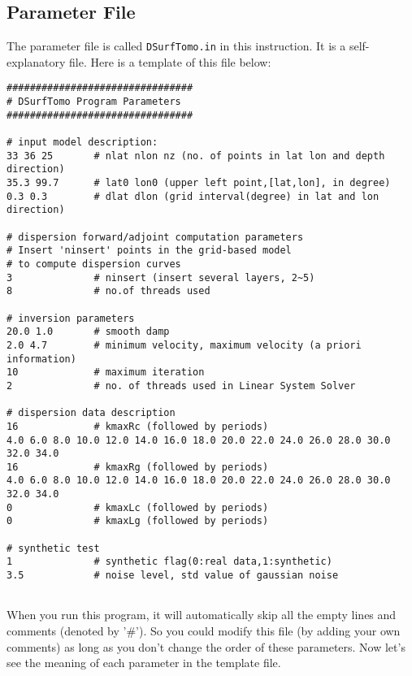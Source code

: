 \documentclass[UTF8]{article}
\begin{document}
\subsection{Parameter File} \label{DSurfTomo}
The parameter file is called \texttt{DSurfTomo.in}
in this instruction. It is a self-explanatory file.
Here is a template of this file below:
\\
\begin{lstlisting}
################################
# DSurfTomo Program Parameters 
################################

# input model description:
33 36 25       # nlat nlon nz (no. of points in lat lon and depth direction)
35.3 99.7      # lat0 lon0 (upper left point,[lat,lon], in degree)
0.3 0.3        # dlat dlon (grid interval(degree) in lat and lon direction)

# dispersion forward/adjoint computation parameters
# Insert 'ninsert' points in the grid-based model 
# to compute dispersion curves
3              # ninsert (insert several layers, 2~5)
8              # no.of threads used 

# inversion parameters
20.0 1.0       # smooth damp
2.0 4.7        # minimum velocity, maximum velocity (a priori information)
10             # maximum iteration
2              # no. of threads used in Linear System Solver

# dispersion data description 
16             # kmaxRc (followed by periods)
4.0 6.0 8.0 10.0 12.0 14.0 16.0 18.0 20.0 22.0 24.0 26.0 28.0 30.0 32.0 34.0
16             # kmaxRg (followed by periods)
4.0 6.0 8.0 10.0 12.0 14.0 16.0 18.0 20.0 22.0 24.0 26.0 28.0 30.0 32.0 34.0
0              # kmaxLc (followed by periods)
0              # kmaxLg (followed by periods)

# synthetic test
1              # synthetic flag(0:real data,1:synthetic)
3.5            # noise level, std value of gaussian noise
    
\end{lstlisting}
When you run this program, it will automatically skip
all the empty lines and comments (denoted by '\#'). So you 
could modify this file (by adding your own comments) as long 
as you don't change the order of these parameters. Now let's
see the meaning of each parameter in the template file.
\end{document}
